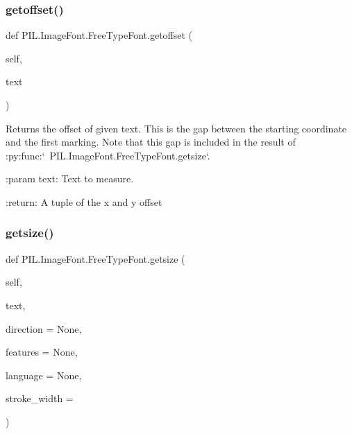 \subsubsection{\texorpdfstring{getoffset()}{getoffset()}}
{\footnotesize\ttfamily def P\+I\+L.\+Image\+Font.\+Free\+Type\+Font.\+getoffset (\begin{DoxyParamCaption}\item[{}]{self,  }\item[{}]{text }\end{DoxyParamCaption})}

\begin{DoxyVerb}Returns the offset of given text. This is the gap between the
starting coordinate and the first marking. Note that this gap is
included in the result of :py:func:`~PIL.ImageFont.FreeTypeFont.getsize`.

:param text: Text to measure.

:return: A tuple of the x and y offset
\end{DoxyVerb}
 \mbox{\label{classPIL_1_1ImageFont_1_1FreeTypeFont_abf6ab8899318de445cd88bf1cd01a961}} 
\subsubsection{\texorpdfstring{getsize()}{getsize()}}
{\footnotesize\ttfamily def P\+I\+L.\+Image\+Font.\+Free\+Type\+Font.\+getsize (\begin{DoxyParamCaption}\item[{}]{self,  }\item[{}]{text,  }\item[{}]{direction = {\ttfamily None},  }\item[{}]{features = {\ttfamily None},  }\item[{}]{language = {\ttfamily None},  }\item[{}]{stroke\+\_\+width = {} }\end{DoxyParamCaption})}

